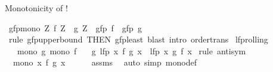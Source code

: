 \begin{isabellebody}
\begin{isamarkuptext}
Monotonicity of !%
\end{isamarkuptext}\isamarkuptrue%
\isamarkupfalse%
\ gfp{\isacharunderscore}{\kern0pt}mono{\isacharcolon}{\kern0pt}\ {\isachardoublequoteopen}{\isacharparenleft}{\kern0pt}{\isasymAnd}Z{\isachardot}{\kern0pt}\ f\ Z\ {\isasymle}\ g\ Z{\isacharparenright}{\kern0pt}\ {\isasymLongrightarrow}\ gfp\ f\ {\isasymle}\ gfp\ g{\isachardoublequoteclose}\isanewline
%
\isadelimproof
\ \ %
\endisadelimproof
%
\isatagproof
{}\isamarkupfalse%
\ {\isacharparenleft}{\kern0pt}rule\ gfp{\isacharunderscore}{\kern0pt}upperbound\ {\isacharbrackleft}{\kern0pt}THEN\ gfp{\isacharunderscore}{\kern0pt}least{\isacharbrackright}{\kern0pt}{\isacharparenright}{\kern0pt}\ {\isacharparenleft}{\kern0pt}blast\ intro{\isacharcolon}{\kern0pt}\ order{\isacharunderscore}{\kern0pt}trans{\isacharparenright}{\kern0pt}%
\endisatagproof
{\isafoldproof}%
%
\isadelimproof
%
\endisadelimproof
%
\isadelimdocument
%
\endisadelimdocument
%
\isatagdocument
%
\isamarkuptrue%
%
\endisatagdocument
{\isafolddocument}%
%
\isadelimdocument
%
\endisadelimdocument
{}\isamarkupfalse%
\ lfp{\isacharunderscore}{\kern0pt}rolling{\isacharcolon}{\kern0pt}\isanewline
\ \ \ {\isachardoublequoteopen}mono\ g{\isachardoublequoteclose}\ {\isachardoublequoteopen}mono\ f{\isachardoublequoteclose}\isanewline
\ \ \ {\isachardoublequoteopen}g\ {\isacharparenleft}{\kern0pt}lfp\ {\isacharparenleft}{\kern0pt}{\isasymlambda}x{\isachardot}{\kern0pt}\ f\ {\isacharparenleft}{\kern0pt}g\ x{\isacharparenright}{\kern0pt}{\isacharparenright}{\kern0pt}{\isacharparenright}{\kern0pt}\ {\isacharequal}{\kern0pt}\ lfp\ {\isacharparenleft}{\kern0pt}{\isasymlambda}x{\isachardot}{\kern0pt}\ g\ {\isacharparenleft}{\kern0pt}f\ x{\isacharparenright}{\kern0pt}{\isacharparenright}{\kern0pt}{\isachardoublequoteclose}\isanewline
%
\isadelimproof
%
\endisadelimproof
%
\isatagproof
{}\isamarkupfalse%
\ {\isacharparenleft}{\kern0pt}rule\ antisym{\isacharparenright}{\kern0pt}\isanewline
\ \ \isamarkupfalse%
\ {\isacharasterisk}{\kern0pt}{\isacharcolon}{\kern0pt}\ {\isachardoublequoteopen}mono\ {\isacharparenleft}{\kern0pt}{\isasymlambda}x{\isachardot}{\kern0pt}\ f\ {\isacharparenleft}{\kern0pt}g\ x{\isacharparenright}{\kern0pt}{\isacharparenright}{\kern0pt}{\isachardoublequoteclose}\isanewline
\ \ \ \ \isamarkupfalse%
\ assms\ \isamarkupfalse%
\ {\isacharparenleft}{\kern0pt}auto\ simp{\isacharcolon}{\kern0pt}\ mono{\isacharunderscore}{\kern0pt}def{\isacharparenright}{\kern0pt}\isanewline

\end{isabellebody}
